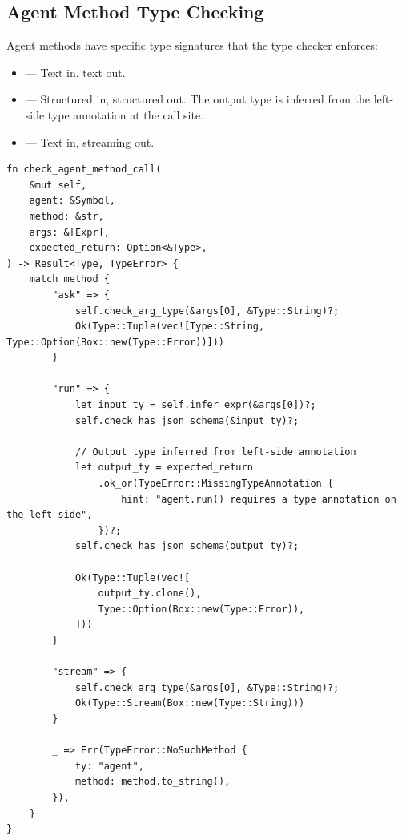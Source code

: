 \subsection{Agent Method Type Checking}

Agent methods have specific type signatures that the type checker enforces:

\begin{itemize}
    \item {} --- Text in, text out.
    \item {} --- Structured in, structured out. The output type  is inferred from the left-side type annotation at the call site.
    \item {} --- Text in, streaming out.
\end{itemize}

\begin{lstlisting}[language={}]
fn check_agent_method_call(
    &mut self,
    agent: &Symbol,
    method: &str,
    args: &[Expr],
    expected_return: Option<&Type>,
) -> Result<Type, TypeError> {
    match method {
        "ask" => {
            self.check_arg_type(&args[0], &Type::String)?;
            Ok(Type::Tuple(vec![Type::String, Type::Option(Box::new(Type::Error))]))
        }

        "run" => {
            let input_ty = self.infer_expr(&args[0])?;
            self.check_has_json_schema(&input_ty)?;

            // Output type inferred from left-side annotation
            let output_ty = expected_return
                .ok_or(TypeError::MissingTypeAnnotation {
                    hint: "agent.run() requires a type annotation on the left side",
                })?;
            self.check_has_json_schema(output_ty)?;

            Ok(Type::Tuple(vec![
                output_ty.clone(),
                Type::Option(Box::new(Type::Error)),
            ]))
        }

        "stream" => {
            self.check_arg_type(&args[0], &Type::String)?;
            Ok(Type::Stream(Box::new(Type::String)))
        }

        _ => Err(TypeError::NoSuchMethod {
            ty: "agent",
            method: method.to_string(),
        }),
    }
}
\end{lstlisting}

